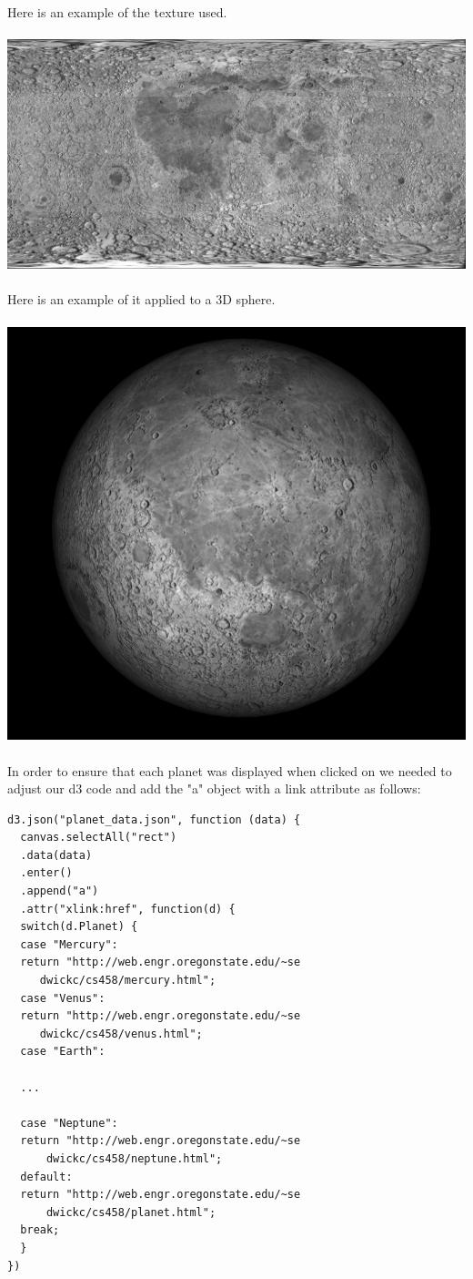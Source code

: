 \documentclass[journal]{vgtc}                %
\begin{document}
Here is an example of the texture used.
\\\\
\includegraphics[width=\linewidth]{moon.jpg}
\\\\
Here is an example of it applied to a 3D sphere.
\\\\
\includegraphics[width=\linewidth]{moon-sphere}
\\\\
In order to ensure that each planet was displayed when clicked on we needed to adjust our d3 code and add the "a" object with a link attribute as follows:\\
\begin{lstlisting}[frame=single]
d3.json("planet_data.json", function (data) {
  canvas.selectAll("rect")
  .data(data)
  .enter()
  .append("a")
  .attr("xlink:href", function(d) {
  switch(d.Planet) {
  case "Mercury":
  return "http://web.engr.oregonstate.edu/~se
     dwickc/cs458/mercury.html";
  case "Venus":
  return "http://web.engr.oregonstate.edu/~se
     dwickc/cs458/venus.html";
  case "Earth":
  
  ...
  
  case "Neptune":
  return "http://web.engr.oregonstate.edu/~se
      dwickc/cs458/neptune.html";
  default:
  return "http://web.engr.oregonstate.edu/~se
      dwickc/cs458/planet.html";
  break;
  }
})
\end{lstlisting}
\end{document}

